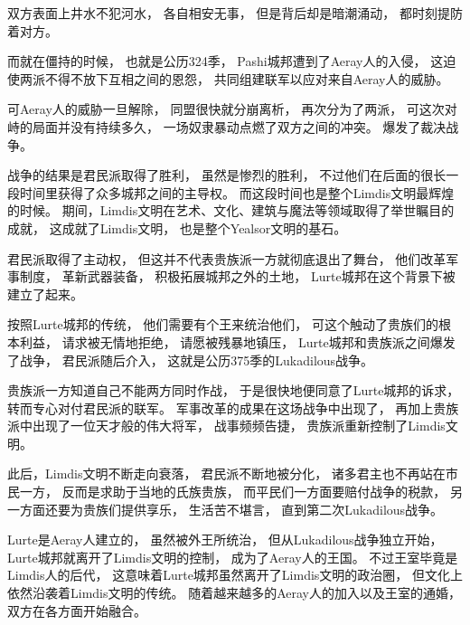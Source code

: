 \documentclass[UTF8,12pt,draft]{ctexbook}
\begin{document}
            双方表面上井水不犯河水，
            各自相安无事，
            但是背后却是暗潮涌动，
            都时刻提防着对方。

            而就在僵持的时候，
            也就是公历324季，
            Pashi城邦遭到了Aeray人的入侵，
            这迫使两派不得不放下互相之间的恩怨，
            共同组建联军以应对来自Aeray人的威胁。

            可Aeray人的威胁一旦解除，
            同盟很快就分崩离析，
            再次分为了两派，
            可这次对峙的局面并没有持续多久，
            一场奴隶暴动点燃了双方之间的冲突。
            爆发了裁决战争。

            战争的结果是君民派取得了胜利，
            虽然是惨烈的胜利，
            不过他们在后面的很长一段时间里获得了众多城邦之间的主导权。
            而这段时间也是整个Limdis文明最辉煌的时候。
            期间，Limdis文明在艺术、文化、建筑与魔法等领域取得了举世瞩目的成就，
            这成就了Limdis文明，
            也是整个Yealsor文明的基石。

            君民派取得了主动权，
            但这并不代表贵族派一方就彻底退出了舞台，
            他们改革军事制度，
            革新武器装备，
            积极拓展城邦之外的土地，
            Lurte城邦在这个背景下被建立了起来。

            按照Lurte城邦的传统，
            他们需要有个王来统治他们，
            可这个触动了贵族们的根本利益，
            请求被无情地拒绝，
            请愿被残暴地镇压，
            Lurte城邦和贵族派之间爆发了战争，
            君民派随后介入，
            这就是公历375季的Lukadilous战争。

            贵族派一方知道自己不能两方同时作战，
            于是很快地便同意了Lurte城邦的诉求，
            转而专心对付君民派的联军。
            军事改革的成果在这场战争中出现了，
            再加上贵族派中出现了一位天才般的伟大将军，
            战事频频告捷，
            贵族派重新控制了Limdis文明。

            此后，Limdis文明不断走向衰落，
            君民派不断地被分化，
            诸多君主也不再站在市民一方，
            反而是求助于当地的氏族贵族，
            而平民们一方面要赔付战争的税款，
            另一方面还要为贵族们提供享乐，
            生活苦不堪言，
            直到第二次Lukadilous战争。

            Lurte是Aeray人建立的，
            虽然被外王所统治，
            但从Lukadilous战争独立开始，
            Lurte城邦就离开了Limdis文明的控制，
            成为了Aeray人的王国。
            不过王室毕竟是Limdis人的后代，
            这意味着Lurte城邦虽然离开了Limdis文明的政治圈，
            但文化上依然沿袭着Limdis文明的传统。
            随着越来越多的Aeray人的加入以及王室的通婚，
            双方在各方面开始融合。
\end{document}
